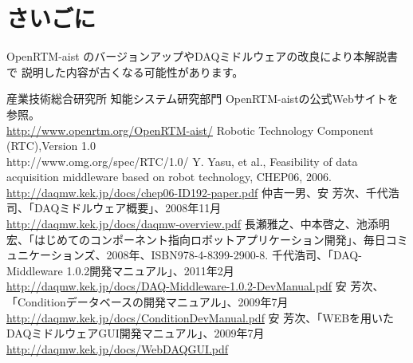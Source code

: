 \documentclass[a4j,10pt,dvips,onecolumn,oneside,final]{jarticle}%
\begin{document}
\section{さいごに}
OpenRTM-aist のバージョンアップやDAQミドルウェアの改良により本解説書で
説明した内容が古くなる可能性があります。

\begin{thebibliography}{99}

   産業技術総合研究所 知能システム研究部門 OpenRTM-aistの公式Webサイトを参照。\\
   \url{http://www.openrtm.org/OpenRTM-aist/}
  Robotic Technology Component (RTC),Version 1.0\\
   http://www.omg.org/spec/RTC/1.0/
  Y. Yasu, et al., Feasibility of data acquisition middleware based on robot technology, CHEP06, 2006.\\
   \url{http://daqmw.kek.jp/docs/chep06-ID192-paper.pdf}
  仲吉一男、安 芳次、千代浩司、「DAQミドルウェア概要」、2008年11月\\
   \url{http://daqmw.kek.jp/docs/daqmw-overview.pdf}
  長瀬雅之、中本啓之、池添明宏、「はじめてのコンポーネント指向ロボットアプリケーション開発」、毎日コミュニケーションズ、2008年、ISBN978-4-8399-2900-8.
 千代浩司、「DAQ-Middleware 1.0.2開発マニュアル」、2011年2月\\
\url{http://daqmw.kek.jp/docs/DAQ-Middleware-1.0.2-DevManual.pdf}
 安 芳次、「Conditionデータベースの開発マニュアル」、2009年7月\\
\url{http://daqmw.kek.jp/docs/ConditionDevManual.pdf}
 安 芳次、「WEBを用いたDAQミドルウェアGUI開発マニュアル」、2009年7月\\
\url{http://daqmw.kek.jp/docs/WebDAQGUI.pdf}
\end{thebibliography}

\newpage
\appendix
\end{document}
